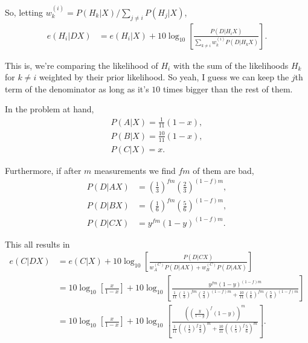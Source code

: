 \documentclass{article}
\begin{document}
So, letting $w_k^{(i)}=P(H_k|X)/\sum_{j\neq i}P(H_j|X)$,
\begin{align*}
	e(H_i|DX)&=e(H_i|X)+10\log_{10}\left[\frac{P(D|H_iX)}{\sum_{k\neq i}w_k^{(i)}P(D|H_kX)}\right].
\end{align*}

This is, we're comparing the likelihood of $H_i$ with the sum of the likelihoods $H_k$ for $k\neq i$ weighted by their prior likelihood. So yeah, I guess we can keep the $j$th term of the denominator as long as it's $10$ times bigger than the rest of them.

In the problem at hand,
\begin{align*}
	P(A|X)=\frac1{11}(1-x),\\
	P(B|X)=\frac{10}{11}(1-x),\\
	P(C|X)=x.
\end{align*}

Furthermore, if after $m$ measurements we find $fm$ of them are bad,
\begin{align*}
	P(D|AX)&=\left(\frac13\right)^{fm}\left(\frac23\right)^{(1-f)m},\\
	P(D|BX)&=\left(\frac16\right)^{fm}\left(\frac56\right)^{(1-f)m},\\
	P(D|CX)&=y^{fm}(1-y)^{(1-f)m}.
\end{align*}

This all results in
\begin{align*}
	e(C|DX)&=e(C|X)+10\log_{10}\left[\frac{P(D|CX)}{w_A^{(C)}P(D|AX)+w_B^{(C)}P(D|AX)}\right]\\
	&=10\log_{10}\left[\frac{x}{1-x}\right]+10\log_{10}\left[\frac{y^{fm}(1-y)^{(1-f)m}}{\frac1{11}\left(\frac13\right)^{fm}\left(\frac23\right)^{(1-f)m}+\frac{10}{11}\left(\frac16\right)^{fm}\left(\frac56\right)^{(1-f)m}}\right]\\
	&=10\log_{10}\left[\frac{x}{1-x}\right]+10\log_{10}\left[\frac{\left(\left(\frac{y}{1-y}\right)^f(1-y)\right)^m}{\frac1{11}\left(\left(\frac12\right)^f\frac23\right)^m+\frac{10}{11}\left(\left(\frac15\right)^f\frac56\right)^m}\right].
\end{align*}
\end{document}
